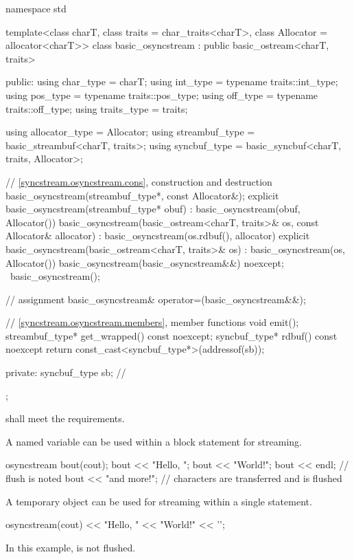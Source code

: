 %
\begin{codeblock}
namespace std {
  template<class charT, class traits = char_traits<charT>, class Allocator = allocator<charT>>
  class basic_osyncstream : public basic_ostream<charT, traits> {
  public:
    using char_type   = charT;
    using int_type    = typename traits::int_type;
    using pos_type    = typename traits::pos_type;
    using off_type    = typename traits::off_type;
    using traits_type = traits;

    using allocator_type = Allocator;
    using streambuf_type = basic_streambuf<charT, traits>;
    using syncbuf_type   = basic_syncbuf<charT, traits, Allocator>;

    // \ref{syncstream.osyncstream.cons}, construction and destruction
    basic_osyncstream(streambuf_type*, const Allocator&);
    explicit basic_osyncstream(streambuf_type* obuf)
      : basic_osyncstream(obuf, Allocator()) {}
    basic_osyncstream(basic_ostream<charT, traits>& os, const Allocator& allocator)
      : basic_osyncstream(os.rdbuf(), allocator) {}
    explicit basic_osyncstream(basic_ostream<charT, traits>& os)
      : basic_osyncstream(os, Allocator()) {}
    basic_osyncstream(basic_osyncstream&&) noexcept;
    ~basic_osyncstream();

    // assignment
    basic_osyncstream& operator=(basic_osyncstream&&);

    // \ref{syncstream.osyncstream.members}, member functions
    void emit();
    streambuf_type* get_wrapped() const noexcept;
    syncbuf_type* rdbuf() const noexcept { return const_cast<syncbuf_type*>(addressof(sb)); }

  private:
    syncbuf_type sb;    // \expos
  };
}
\end{codeblock}

\pnum
{} shall meet
the  requirements.

\pnum
\begin{example}
A named variable can be used within a block statement for streaming.
\begin{codeblock}
{
  osyncstream bout(cout);
  bout << "Hello, ";
  bout << "World!";
  bout << endl; // flush is noted
  bout << "and more!\n";
}   // characters are transferred and  is flushed
\end{codeblock}
\end{example}

\pnum
\begin{example}
A temporary object can be used for streaming within a single statement.
\begin{codeblock}
osyncstream(cout) << "Hello, " << "World!" << '\n';
\end{codeblock}
In this example,  is not flushed.
\end{example}

